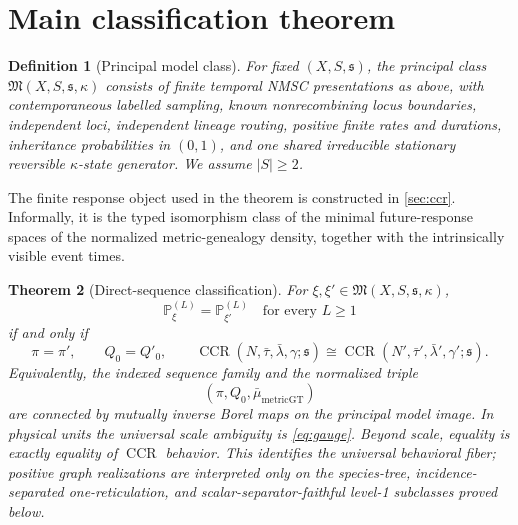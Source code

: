 \documentclass[11pt]{article}
\newtheorem{theorem}{Theorem}[section]
\newtheorem{definition}[theorem]{Definition}
\newcommand{\CCR}{\operatorname{CCR}}
\begin{document}
\section{Main classification theorem}
\label{sec:main}

\begin{definition}[Principal model class]
\label{def:principal}
For fixed $(X,S,\mathfrak s)$, the principal class $\mathfrak M(X,S,\mathfrak s,\kappa)$ consists of finite temporal NMSC presentations as above, with contemporaneous labelled sampling, known nonrecombining locus boundaries, independent loci, independent lineage routing, positive finite rates and durations, inheritance probabilities in $(0,1)$, and one shared irreducible stationary reversible $\kappa$-state generator.  We assume $|S|\ge2$.
\end{definition}

The finite response object used in the theorem is constructed in \cref{sec:ccr}.  Informally, it is the typed isomorphism class of the minimal future-response spaces of the normalized metric-genealogy density, together with the intrinsically visible event times.

\begin{theorem}[Direct-sequence classification]
\label{thm:classification}
For $\xi,\xi'\in\mathfrak M(X,S,\mathfrak s,\kappa)$,
\begin{equation}
\mathbb P_\xi^{(L)}=\mathbb P_{\xi'}^{(L)}\quad\text{for every }L\ge1
\label{eq:indexed-equality}
\end{equation}
if and only if
\begin{equation}
\pi=\pi',\qquad Q_0=Q'_0,
\qquad
\CCR(N,\bar\tau,\bar\lambda,\gamma;\mathfrak s)
 \cong
\CCR(N',\bar\tau',\bar\lambda',\gamma';\mathfrak s).
\label{eq:ccr-class}
\end{equation}
Equivalently, the indexed sequence family and the normalized triple
\[
(\pi,Q_0,\bar\mu_{\mathrm{metricGT}})
\]
are connected by mutually inverse Borel maps on the principal model image.
In physical units the universal scale ambiguity is \eqref{eq:gauge}.  Beyond scale, equality is exactly equality of $\CCR$ behavior.  This identifies the universal behavioral fiber; positive graph realizations are interpreted only on the species-tree, incidence-separated one-reticulation, and scalar-separator-faithful level-1 subclasses proved below.
\end{theorem}
\end{document}
